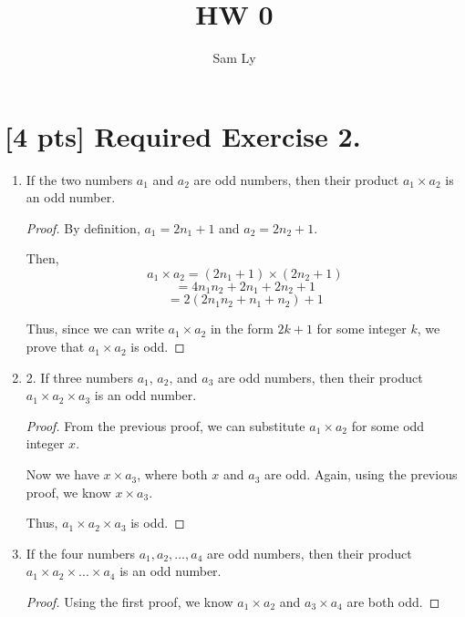 \documentclass{article}
\title{HW 0}
\author{Sam Ly}
\begin{document}
\maketitle

\section*{[4 pts] Required Exercise 2.}

\begin{enumerate}
    \item {
        If the two numbers \(a_1\) and \(a_2\) are odd numbers,
        then their product \(a_1 \times a_2\) is an odd number.

        \begin{proof}
            By definition, \(a_1 = 2n_1 + 1\) and \(a_2 = 2n_2 + 1\).

            Then, 
            \[ a_1 \times a_2 = (2n_1 + 1) \times (2n_2 + 1)\]
            \[ = 4n_1n_2 + 2n_1 + 2n_2 + 1\]
            \[ = 2(2n_1n_2 + n_1 + n_2) + 1 \]

            Thus, since we can write \(a_1 \times a_2 \) in the form \(2k + 1 \) for some
            integer \(k\), we prove that \(a_1 \times a_2 \) is odd.
        \end{proof}
    }

    \item {
        2. If three numbers $a_1$, $a_2$, and $a_3$ are odd numbers, then their product 
        \(a_1 \times a_2 \times a_3 \) is an odd number.

        \begin{proof}
            From the previous proof, we can substitute \(a_1 \times a_2 \) for 
            some odd integer \(x\).

            Now we have \(x \times a_3\), where both \(x\) and \(a_3\) are odd.
            Again, using the previous proof, we know \(x \times a_3\).

            Thus, \(a_1 \times a_2 \times a_3 \) is odd.
        \end{proof}
    }

    \item {
        If the four numbers \(a_1, a_2, ..., a_4 \)
        are odd numbers, then their product \(a_1 \times a_2 \times ... \times a_4\)
        is an odd number.

        \begin{proof}
            Using the first proof, we know \(a_1 \times a_2 \)  and \(a_3 \times a_4\) 
            are both odd.


\end{proof}}
\end{enumerate}
\end{document}
